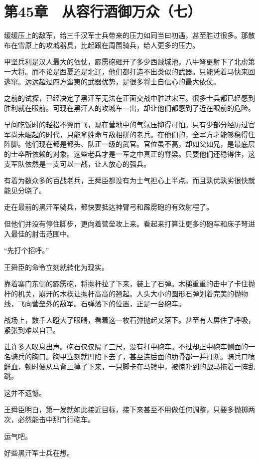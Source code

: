 \section{第45章　从容行酒御万众（七）}

缓缓压上的敌军，给三千汉军士兵带来的压力如同当曰初遇，甚至胜过很多。那散布在雪原上的攻城器具，比起跟在周围骑兵，给人更多的压力。

甲坚兵利是汉人最大的依仗，霹雳砲砸开了多少西贼城池，八牛弩更射下了北虏第一大将。而不论是西夏还是北辽，他们都打造不出类似的武器。只能凭着马快来回逃窜。远远超过四方蛮夷的武器优势，是很多将士自信心的最大依仗。

之前的试探，已经决定了黑汗军无法在正面交战中胜过宋军。很多士兵都已经感到胜利就在眼前。可现在黑汗人的攻城车一出，却让他们都感到了近在眼前的危险。

早间吃饭时的轻松不翼而飞，现在营地中的气氛压抑得可怕。只有少部分经历过官军尚未崛起的时代，只能拿姓命与敌相拼的老兵。在他们的，全军方才能够稳得住阵脚。他们现在都是都头、队正一级的武官。官位虽不高，却如父如兄，是最底层的士卒所依赖的对象。这些老兵才是一军之中真正的脊梁。只要他们还稳得住，这支军队依然是一支可以一战，让人放心的强兵。

有着为数众多的百战老兵，王舜臣都没有为士气担心上半点。而且孰优孰劣很快就能见分晓了。

走在最前的黑汗军骑兵，都快要抵达神臂弓和霹雳砲的有效射程了。

但他们并没有停住脚步，更向着营垒攻上来。看起来打算让更多的砲车和床子弩进入最佳的射击范围中。

“先打个招呼。”

王舜臣的命令立刻就转化为现实。

靠着寨门东侧的霹雳砲，将抛杆拉了下来，装上了石弹。木槌重重的击中了卡住抛杆的机关，崩开的木楔让抛杆高高的翘起。人头大小的圆形石弹划着完美的抛物线，飞向营垒外的敌军。石弹落下的位置，正是一台砲车。

战场上，数千人瞪大了眼睛，看着这一枚石弹抛起又落下。甚至有人屏住了呼吸，紧张到难以自已。

让许多人叹息出声。砲石仅仅隔了三尺，没有打中砲车。不过却正中砲车侧面的一名骑兵的胸口。胸甲立刻就凹陷下去了，甚至连后面的肋骨都一并打断。骑兵口喷鲜血，顿时便从马背上掉了下来，一只脚卡在马镫中，被惊吓到的战马拖着一阵乱跳。

这并不遗憾。

王舜臣明白，第一发就如此接近目标，接下来甚至不用做任何调整，只要多抛掷两次，必然能击中那门行砲车。

运气吧。

好些黑汗军士兵在想。

